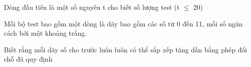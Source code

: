 Dòng đầu tiên là một số nguyên t cho biết số lượng test (t $\le$ 20)  

   Mỗi bộ test bao gồm một dòng là dãy bao gồm các số từ 0 đến 11, mỗi số ngăn cách bởi một khoảng trắng.  

   Biết rằng mỗi dãy số cho trước luôn luôn có thể sắp xếp tăng dần bằng phép đổi chỗ đã quy định